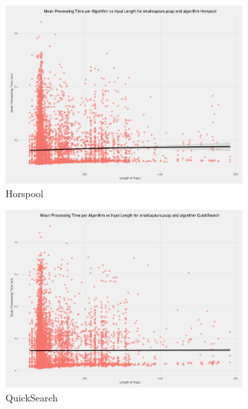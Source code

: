 \documentclass[11pt]{article}
\begin{document}
\begin{figure}[!htb]
  \centering
  \begin{subfigure}[b]{0.45\textwidth}
      \includegraphics[width=\textwidth]{images/scatter_mean_vs_input_length_Horspool}
      \caption{Horspool}
  \end{subfigure}
  \begin{subfigure}[b]{0.45\textwidth}
      \includegraphics[width=\textwidth]{images/scatter_mean_vs_input_length_QuickSearch}
      \caption{QuickSearch}
  \end{subfigure}
  ~
  \begin{subfigure}[b]{0.45\textwidth}

\end{subfigure}
\end{figure}
\end{document}
